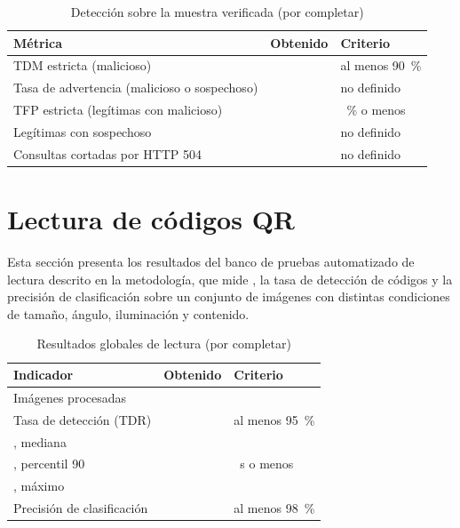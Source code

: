\begin{table}[H]
	\centering
	\caption{Detección sobre la muestra verificada (por completar)}
	\label{tab:tdm}
	\begin{tabular}{@{}>{\raggedright\arraybackslash}p{6.6cm}>{\raggedright\arraybackslash}p{2.6cm}>{\raggedright\arraybackslash}p{2.6cm}@{}}
		\toprule
		\textbf{Métrica} & \textbf{Obtenido} & \textbf{Criterio} \\
		\midrule
		TDM estricta (malicioso) & & al menos 90~\% \\
		Tasa de advertencia (malicioso o sospechoso) & & no definido \\
		TFP estricta (legítimas con malicioso) & & 5~\% o menos \\
		Legítimas con sospechoso & & no definido \\
		Consultas cortadas por HTTP 504 & & no definido \\
		\bottomrule
	\end{tabular}
\end{table}

\section{Lectura de códigos QR}
\label{sec:lectura}

Esta sección presenta los resultados del banco de pruebas automatizado de lectura descrito en la metodología, que mide \tscan{}, la tasa de detección de códigos y la precisión de clasificación sobre un conjunto de imágenes con distintas condiciones de tamaño, ángulo, iluminación y contenido.


\begin{table}[H]
	\centering
	\caption{Resultados globales de lectura (por completar)}
	\label{tab:lectura-global}
	\begin{tabular}{@{}>{\raggedright\arraybackslash}p{6.6cm}>{\raggedright\arraybackslash}p{2.6cm}>{\raggedright\arraybackslash}p{2.6cm}@{}}
		\toprule
		\textbf{Indicador} & \textbf{Obtenido} & \textbf{Criterio} \\
		\midrule
		Imágenes procesadas & & \\
		Tasa de detección (TDR) & & al menos 95~\% \\
		\tscan{}, mediana & & \\
		\tscan{}, percentil 90 & & 5~s o menos \\
		\tscan{}, máximo & & \\
		Precisión de clasificación & & al menos 98~\% \\
		\bottomrule
	\end{tabular}
\end{table}

